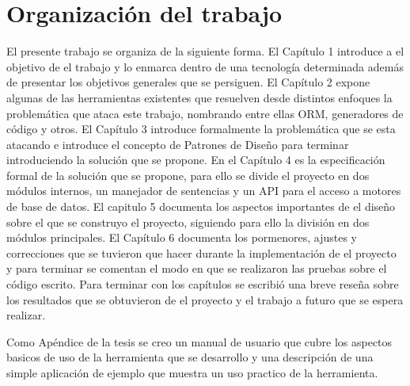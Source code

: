 \section{Organización del trabajo}
%
El presente trabajo se organiza de la siguiente forma. El Capítulo 1 introduce a el objetivo de el trabajo y lo enmarca dentro de una tecnología determinada además de presentar los objetivos generales que se persiguen. El Capítulo 2 expone algunas de las herramientas existentes que resuelven desde distintos enfoques la problemática que ataca este trabajo, nombrando entre ellas ORM, generadores de código y otros. El Capítulo 3 introduce formalmente la problemática que se esta atacando e introduce el concepto de Patrones de Diseño para terminar introduciendo la solución que se propone. En el Capítulo 4 es la especificación formal de la solución que se propone, para ello se divide el proyecto en dos módulos internos, un manejador de sentencias y un API para el acceso a motores de base de datos. El capitulo 5 documenta los aspectos importantes de el diseño sobre el que se construyo el proyecto, siguiendo para ello la división en dos módulos principales. El Capítulo 6 documenta los pormenores, ajustes y correcciones que se tuvieron que hacer durante la implementación de el proyecto y para terminar se comentan el modo en que se realizaron las pruebas sobre el código escrito. Para terminar con los capítulos se escribió una breve reseña sobre los resultados que se obtuvieron de el proyecto y el trabajo a futuro que se espera realizar.

Como Apéndice de la tesis se creo un manual de usuario que cubre los aspectos basicos de uso de la herramienta que se desarrollo y una descripción de una simple aplicación de ejemplo que muestra un uso practico de la herramienta.     



